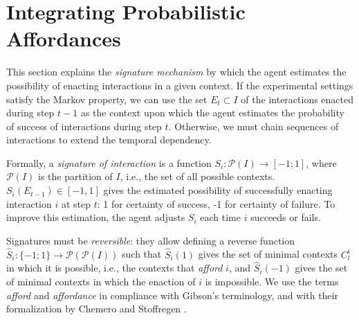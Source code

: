 \documentclass[conference]{IEEEtran}
\begin{document}
\section{Integrating Probabilistic Affordances}\label{signatures}


This section explains the \textit{signature mechanism} by which the agent estimates the possibility of enacting interactions in a given context. 
If the experimental settings satisfy the Markov property, we can use the set $E_t \subset I$ of the interactions enacted during step $t-1$ as the context upon which the agent estimates the probability of success of interactions during step $t$. 
Otherwise, we must chain sequences of interactions to extend the temporal dependency. 



Formally, a \textit{signature of interaction} is a function $S_i : \mathcal{P}(I) \rightarrow [-1;1]$, where $\mathcal{P}(I)$ is the partition of $I$, i.e., the set of all possible contexts.
$S_i(E_{t-1}) \in [-1, 1]$ gives the estimated possibility of successfully enacting interaction $i$ at step $t$: 1 for certainty of success, -1 for certainty of failure. 
To improve this estimation, the agent adjusts $S_i$ each time $i$ succeeds or fails. %

Signatures must be \textit{reversible}: they allow defining a reverse function $\hat{S}_i : \{-1;1\} \rightarrow \mathcal{P}(\mathcal{P}(I))$ such that  $\hat{S}_i(1)$ gives the set of minimal contexts $C_l^i$ in which it is possible, i.e., the contexts that \textit{afford} $i$, and $\hat{S}_i(-1)$ gives the set of minimal contexts in which the enaction of $i$ is impossible.
We use the terms \textit{afford} and \textit{affordance} in compliance with Gibson's terminology, and with their formalization by Chemero \cite{chemero:affordance} and Stoffregen \cite{stoffregen:affordance}. 
\end{document}
